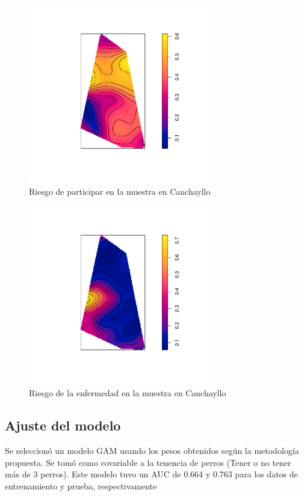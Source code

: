 \begin{figure}[h]
	\centering
	\includegraphics[width=0.7\textwidth]{graficos/canchayllo_risk_to_sampling.pdf}
	\caption{Riesgo de participar en la muestra en Canchayllo}
	\label{canchayllo_risk_to_sampling}
\end{figure}

\newpage

\begin{figure}[h]
	\centering
	\includegraphics[width=0.7\textwidth]{graficos/canchayllo_risk_to_disease.pdf}
	\caption{Riesgo de la enfermedad en la muestra en Canchayllo}
	\label{canchayllo_risk_to_disease}
\end{figure}

\newpage

\subsection*{Ajuste del modelo}
Se seleccionó un modelo GAM usando los pesos obtenidos según la metodología propuesta. Se tomó como covariable a la tenencia de perros (Tener o no tener más de 3 perros). Este modelo tuvo un AUC de 0.664 y 0.763 para los datos de entrenamiento y prueba, respectivamente

